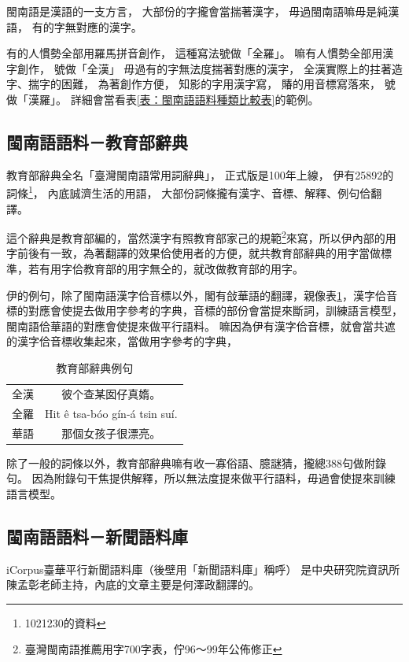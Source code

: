 閩南語是漢語的一支方言，
大部份的字攏會當揣著漢字，
毋過閩南語嘛毋是純漢語，
有的字無對應的漢字。

有的人慣勢全部用羅馬拼音創作，
這種寫法號做「全羅」。
嘛有人慣勢全部用漢字創作，
號做「全漢」
毋過有的字無法度揣著對應的漢字，
全漢實際上的拄著造字、揣字的困難，
為著創作方便，
知影的字用漢字寫，
賰的用音標寫落來，
號做「漢羅」。
詳細會當看表\ref{表：閩南語語料種類比較表}的範例。

\subsection{閩南語語料－教育部辭典}
\label{節：教育部辭典}
教育部辭典全名「臺灣閩南語常用詞辭典」\cite{教育部臺灣閩南語常用詞辭典}，
正式版是100年上線，
伊有25892的詞條\footnote{1021230的資料}，
內底誠濟生活的用語，
大部份詞條攏有漢字、音標、解釋、例句佮翻譯。

這个辭典是教育部編的，當然漢字有照教育部家己的規範\footnote{臺灣閩南語推薦用字700字表，佇96～99年公佈修正}來寫，所以伊內部的用字前後有一致，為著翻譯的效果佮使用者的方便，就共教育部辭典的用字當做標準，若有用字佮教育部的用字無仝的，就改做教育部的用字。%

伊的例句，除了閩南語漢字佮音標以外，閣有敆華語的翻譯，親像表\ref{表：教育部辭典例句}，漢字佮音標的對應會使提去做用字參考的字典，音標的部份會當提來斷詞，訓練語言模型，閩南語佮華語的對應會使提來做平行語料。
嘛因為伊有漢字佮音標，就會當共遮的漢字佮音標收集起來，當做用字參考的字典，
\begin{table}
\caption{教育部辭典例句}
\label{表：教育部辭典例句}
\centering
\begin{tabular}{c|c}
全漢 & 彼个查某囡仔真媠。 \\
全羅 & Hit ê tsa-bóo gín-á tsin suí.\\
華語 & 那個女孩子很漂亮。\\
\end{tabular}
\end{table}

除了一般的詞條以外，教育部辭典嘛有收一寡俗語、臆謎猜，攏總388句做附錄句。
因為附錄句干焦提供解釋，所以無法度提來做平行語料，毋過會使提來訓練語言模型。


\subsection{閩南語語料－新聞語料庫}
\label{節：新聞語料庫}
iCorpus臺華平行新聞語料庫（後壁用「新聞語料庫」稱呼）\cite{iCorpus臺華平行新聞語料庫}
是中央研究院資訊所陳孟彰老師主持，內底的文章主要是何澤政翻譯的。

